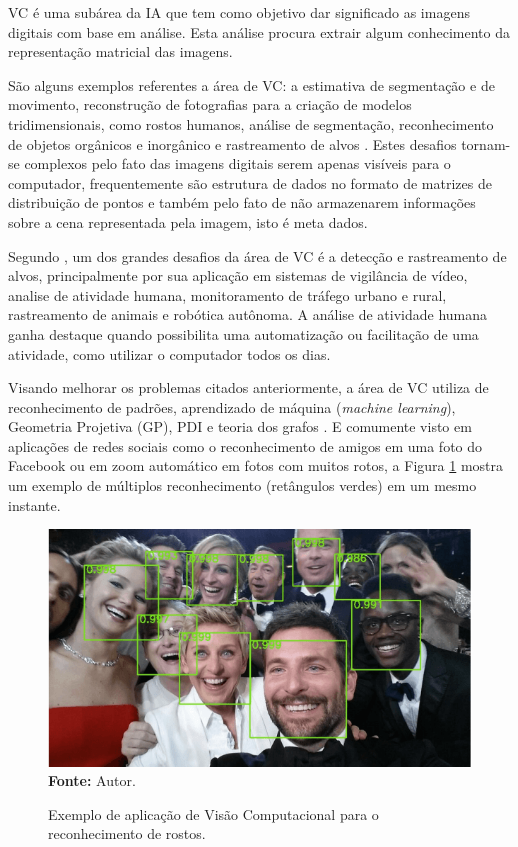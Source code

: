 VC é uma subárea da IA que tem como objetivo dar significado as imagens digitais com base em análise. Esta análise procura extrair algum conhecimento da representação matricial das imagens. 

São alguns exemplos referentes a área de VC: a estimativa de segmentação e de movimento, reconstrução de fotografias para a criação de modelos tridimensionais, como rostos humanos, análise de segmentação, reconhecimento de objetos orgânicos e inorgânico e rastreamento de alvos . Estes desafios tornam-se complexos pelo fato das imagens digitais serem apenas visíveis para o computador, frequentemente são estrutura de dados no formato de matrizes de distribuição de pontos e também pelo fato de não armazenarem informações sobre a cena representada pela imagem, isto é meta dados.

Segundo , um dos grandes desafios da área de VC é a detecção e rastreamento de alvos, principalmente por sua aplicação em sistemas de vigilância de vídeo, analise de atividade humana, monitoramento de tráfego urbano e rural, rastreamento de animais e robótica autônoma. A análise de atividade humana ganha destaque quando possibilita uma automatização ou facilitação de uma atividade, como utilizar o computador todos os dias.

Visando melhorar os problemas citados anteriormente, a área de VC utiliza de reconhecimento de padrões, aprendizado de máquina (\textit{machine learning}), Geometria Projetiva (GP), PDI e teoria dos grafos . E comumente visto em aplicações de redes sociais como o reconhecimento de amigos em uma foto do Facebook ou em zoom automático em fotos com muitos rotos, a Figura \ref{fig:exemplo-vc} mostra um exemplo de múltiplos reconhecimento (retângulos verdes) em um mesmo instante.

\begin{figure}[htbp]
\caption{Exemplo de aplicação de Visão Computacional para o reconhecimento de rostos.}
 \centering \includegraphics[scale=1]{img/figura-1.png}
 \textbf{Fonte:} Autor.
\label{fig:exemplo-vc}
\end{figure}



